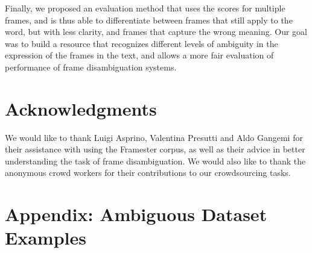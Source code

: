 Finally, we proposed an evaluation method that uses the scores for multiple frames, and is thus able to differentiate between frames that still apply to the word, but with less clarity, and frames that capture the wrong meaning. Our goal was to build a resource that recognizes different levels of ambiguity in the expression of the frames in the text, and allows a more fair evaluation of performance of frame disambiguation systems.

\section*{Acknowledgments}

We would like to thank Luigi Asprino, Valentina Presutti and Aldo Gangemi for their assistance with using the Framester corpus, as well as their advice in better understanding the task of frame disambiguation. We would also like to thank the anonymous crowd workers for their contributions to our crowdsourcing tasks.

\section{Appendix: Ambiguous Dataset Examples}

